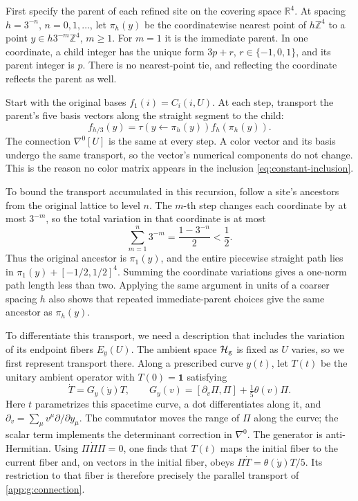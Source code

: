 \documentclass[11pt,a4paper]{article}
\theoremstyle{remark}
\newcommand{\Id}{\mathbf 1}
\begin{document}
First specify the parent of each refined site on the covering space $\mathbb R^4$. At
spacing $h=3^{-n}$, $n=0,1,\ldots$, let $\pi_h(y)$ be the
coordinatewise nearest point of $h\mathbb Z^4$ to a point
$y\in h3^{-m}\mathbb Z^4$, $m\ge1$. For $m=1$ it is the
immediate parent. In one coordinate, a child integer has the unique form
$3p+r$, $r\in\{-1,0,1\}$, and its parent integer is $p$.
There is no nearest-point tie, and reflecting the coordinate reflects
the parent as well.

Start with the original bases $f_1(i)=C_i(i,U)$. At each step,
transport the parent's five basis vectors along the straight segment to
the child:
\begin{equation}
 f_{h/3}(y)=\tau(y\leftarrow\pi_h(y))f_h(\pi_h(y)).
\end{equation}
The connection $\nabla^0[U]$ is the same at every step. A color vector
and its basis undergo the same transport, so the vector's numerical
components do not change. This is the reason no color matrix appears in
the inclusion \eqref{eq:constant-inclusion}.

To bound the transport accumulated in this recursion, follow a site's
ancestors from the original lattice to level $n$. The $m$-th step
changes each coordinate by at most $3^{-m}$, so the total variation
in that coordinate is at most
\begin{equation}
 \sum_{m=1}^n3^{-m}=\frac{1-3^{-n}}2<\frac12 .
\end{equation}
Thus the original ancestor is $\pi_1(y)$, and the entire piecewise
straight path lies in $\pi_1(y)+[-1/2,1/2]^4$. Summing the
coordinate variations gives a one-norm path length less than two.
Applying the same argument in units of a coarser spacing $h$ also
shows that repeated immediate-parent choices give the same ancestor as
$\pi_h(y)$.

To differentiate this transport, we need a description that includes the
variation of its endpoint fibers $E_y(U)$. The ambient space
$\mathcal H_{\rm g}$ is fixed as $U$ varies, so we first represent
transport there. Along a prescribed curve $y(t)$, let $T(t)$ be
the unitary ambient operator with $T(0)=\Id$ satisfying
\begin{equation}
 \dot T=G_y(\dot y)T,\qquad
 G_y(v)=[\partial_v\Pi,\Pi]+\tfrac15\theta(v)\Pi .
 \label{app:g:transport}
\end{equation}
Here $t$ parametrizes this spacetime curve, a dot differentiates along it, and
$\partial_v=\sum_\mu v^\mu\partial/\partial y_\mu$. The
commutator moves the range of $\Pi$ along the curve; the scalar term
implements the determinant correction in $\nabla^0$. The generator
is anti-Hermitian. Using $\Pi\dot\Pi\Pi=0$, one finds that
$T(t)$ maps the initial fiber to the current fiber and, on vectors in
the initial fiber, obeys
$\Pi\dot T=\theta(\dot y)T/5$. Its restriction to that fiber is
therefore precisely the parallel transport of
\eqref{app:g:connection}.
\end{document}
